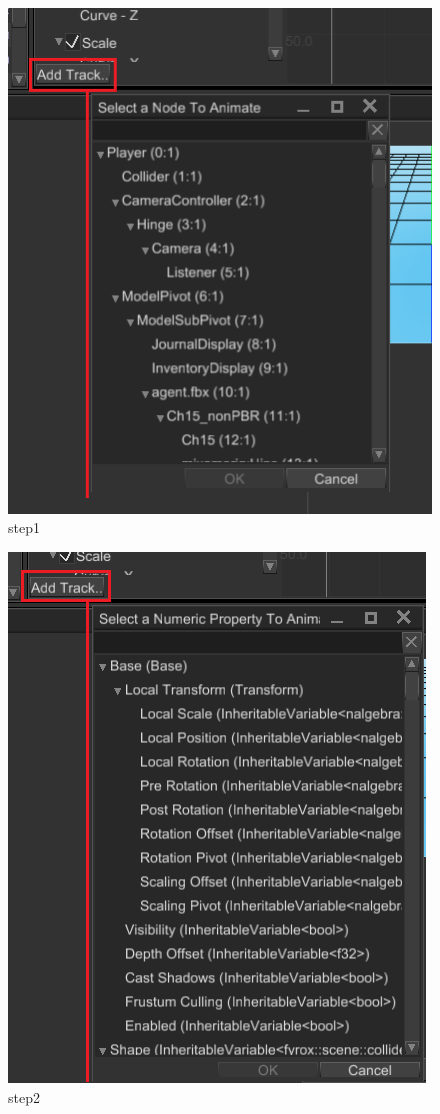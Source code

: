 \documentclass[
]{book}
\theoremstyle{definition}
\theoremstyle{definition}
\theoremstyle{definition}
\theoremstyle{definition}
\theoremstyle{remark}
\begin{document}
\begin{figure}
\centering
\includegraphics{images/animation/ae_add_track_select_node.png}
\caption{step1}
\end{figure}

\begin{figure}
\centering
\includegraphics{images/animation/ae_add_track_select_property.png}
\caption{step2}
\end{figure}
\end{document}
